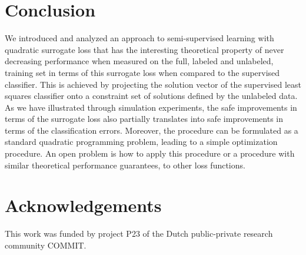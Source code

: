 \documentclass[sts,preprint]{imsart-custom}
\renewcommand{\vec}[1]{\mathbf{#1}}
\begin{document}


\section{Conclusion}
We introduced and analyzed an approach to semi-supervised learning with quadratic surrogate loss that has the interesting theoretical property of never decreasing performance when measured on the full, labeled and unlabeled, training set in terms of this surrogate loss when compared to the supervised classifier. This is achieved by projecting the solution vector of the supervised least squares classifier onto a constraint set of solutions defined by the unlabeled data. As we have illustrated through simulation experiments, the safe improvements in terms of the surrogate loss also partially translates into safe improvements in terms of the classification errors. Moreover, the procedure can be formulated as a standard quadratic programming problem, leading to a simple optimization procedure. An open problem is how to apply this procedure or a procedure with similar theoretical performance guarantees, to other loss functions.

\section*{Acknowledgements}
This work was funded by project P23 of the Dutch public-private research community COMMIT.



\end{document}
